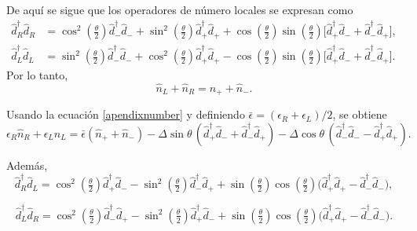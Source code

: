 \begin{appendixs}
De aquí se sigue que los operadores de número locales se expresan como
\begin{align*}
    \hat{d}^{\dagger}_{R}\hat{d}_{R} & =
    \cos^{2}(\tfrac{\theta}{2}) \hat{d}^{\dagger}_{-}\hat{d}_{-} + \sin^{2}(\tfrac{\theta}{2}) \hat{d}^{\dagger}_{+}\hat{d}_{+}
    + \cos(\tfrac{\theta}{2})\sin(\tfrac{\theta}{2})\big[\hat{d}^{\dagger}_{+}\hat{d}_{-} + \hat{d}^{\dagger}_{-}\hat{d}_{+} \big], \\
    \hat{d}^{\dagger}_{L}\hat{d}_{L} & =
    \sin^{2}(\tfrac{\theta}{2}) \hat{d}^{\dagger}_{-}\hat{d}_{-} + \cos^{2}(\tfrac{\theta}{2}) \hat{d}^{\dagger}_{+}\hat{d}_{+}
    - \cos(\tfrac{\theta}{2})\sin(\tfrac{\theta}{2})\big[\hat{d}^{\dagger}_{+}\hat{d}_{-} + \hat{d}^{\dagger}_{-}\hat{d}_{+} \big].
\end{align*}
Por lo tanto,
\begin{equation}
    \hat{n}_{L} + \hat{n}_{R} = \hat{n}_{+} + \hat{n}_{-}.
    \label{apendixnumber}
\end{equation}

Usando la ecuación \eqref{apendixnumber} y definiendo $\bar{\epsilon} = (\epsilon_{R} + \epsilon_{L})/2$, se obtiene
\begin{equation}
    \epsilon_{R} \hat{n}_{R} + \epsilon_{L} \hat{n}_{L}
    = \bar{\epsilon}( \hat{n}_{+} + \hat{n}_{-} )
    - \Delta \sin\theta \, (\hat{d}^{\dagger}_{+}\hat{d}_{-} + \hat{d}^{\dagger}_{-}\hat{d}_{+})
    - \Delta \cos\theta \, (\hat{d}^{\dagger}_{-}\hat{d}_{-} - \hat{d}^{\dagger}_{+}\hat{d}_{+}).
\label{apendix5:ec1}
\end{equation}

Además,
\begin{equation}
    \hat{d}^{\dagger}_{R}\hat{d}_{L} =
    \cos^{2}(\tfrac{\theta}{2})\hat{d}^{\dagger}_{+}\hat{d}_{-}
    - \sin^{2}(\tfrac{\theta}{2}) \hat{d}^{\dagger}_{-}\hat{d}_{+}
    + \sin(\tfrac{\theta}{2})\cos(\tfrac{\theta}{2})\big( \hat{d}^{\dagger}_{+}\hat{d}_{+} - \hat{d}^{\dagger}_{-}\hat{d}_{-} \big),
    \label{apendix5:ec2}
\end{equation}

\begin{equation}
    \hat{d}^{\dagger}_{L}\hat{d}_{R} =
    \cos^{2}(\tfrac{\theta}{2})\hat{d}^{\dagger}_{-}\hat{d}_{+}
    - \sin^{2}(\tfrac{\theta}{2}) \hat{d}^{\dagger}_{+}\hat{d}_{-}
    + \sin(\tfrac{\theta}{2})\cos(\tfrac{\theta}{2})\big( \hat{d}^{\dagger}_{+}\hat{d}_{+} - \hat{d}^{\dagger}_{-}\hat{d}_{-} \big).
    \label{apendix5:ec3}
\end{equation}


\end{appendixs}
